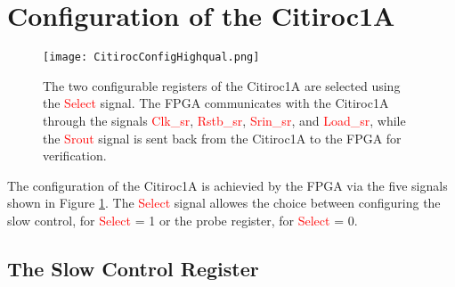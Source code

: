 \section{Configuration of the Citiroc1A}\label{sec:configuration}
\begin{figure}[h]
    \centering
    \texttt{[image: CitirocConfigHighqual.png]}
    \caption{The two configurable registers of the Citiroc1A are selected using the \textcolor{red}{Select} signal. 
    The FPGA communicates with the Citiroc1A through the signals \textcolor{red}{Clk\_sr}, \textcolor{red}{Rstb\_sr}, 
    \textcolor{red}{Srin\_sr}, and \textcolor{red}{Load\_sr}, while the \textcolor{red}{Srout} signal is sent back from the Citiroc1A to the FPGA for verification.\autocite{datasheetCITIROC}}
    \label{fig:CITIROC1A_config}
\end{figure}
The configuration of the Citiroc1A is achievied by the FPGA via the five signals shown in Figure \ref{fig:CITIROC1A_config}.
The \textcolor{red}{Select} signal allowes the choice between configuring the slow control, for \textcolor{red}{Select} = 1  or the probe register, for \textcolor{red}{Select} = 0.\autocite{datasheetCITIROC}

\subsection{The Slow Control Register}

